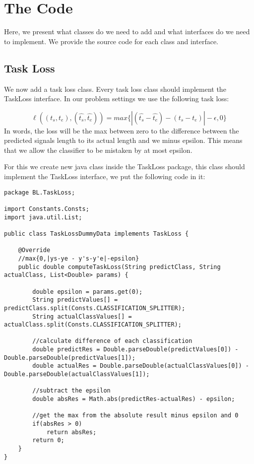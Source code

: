 \documentclass[11pt, oneside]{article}   	%
\begin{document}
\section{The Code}
Here, we present what classes do we need to add and what interfaces do we need to implement. We provide the source code for each class and interface.
\subsection{Task Loss}
We now add a task loss class. Every task loss class should implement the TaskLoss interface. In our problem settings we use the following task loss: 

\begin{equation}
\label{eq:loss}
\ell ((t_{s}, t_{e}),(\hat{t_{s}}, \hat{t_{e}})) = max{\{|(\hat{t_{s}}-\hat{t_{e}}) - (t_{s} - t_{e})| - \epsilon ,0\}}
\end{equation} 
In words, the loss will be the max between zero to the difference between the predicted signals length to its actual length and we minus epsilon. This means that we allow the classifier to be mistaken by at most epsilon.

For this we create new java class inside the TaskLoss package, this class should implement the TaskLoss interface, we put the following code in it:
\begin{lstlisting}
package BL.TaskLoss;

import Constants.Consts;
import java.util.List;

public class TaskLossDummyData implements TaskLoss {

	@Override
	//max{0,|ys-ye - y's-y'e|-epsilon}
	public double computeTaskLoss(String predictClass, String actualClass, List<Double> params) {

        double epsilon = params.get(0);
		String predictValues[] = predictClass.split(Consts.CLASSIFICATION_SPLITTER);
		String actualClassValues[] = actualClass.split(Consts.CLASSIFICATION_SPLITTER);
	
		//calculate difference of each classification
		double predictRes = Double.parseDouble(predictValues[0]) - Double.parseDouble(predictValues[1]);
		double actualRes = Double.parseDouble(actualClassValues[0]) - Double.parseDouble(actualClassValues[1]);
		
		//subtract the epsilon		
		double absRes = Math.abs(predictRes-actualRes) - epsilon;
		
		//get the max from the absolute result minus epsilon and 0
		if(absRes > 0)
			return absRes;
		return 0;
	}
}
\end{lstlisting}
\end{document}
